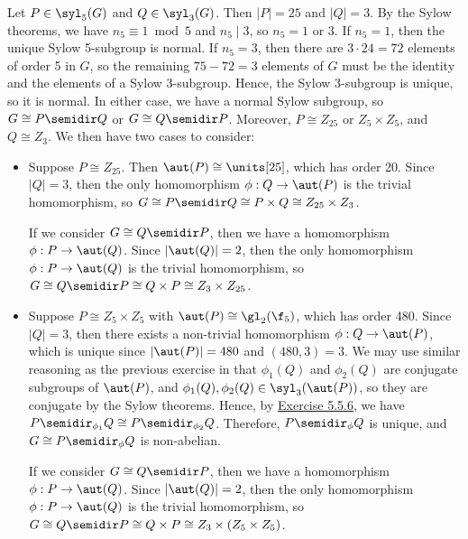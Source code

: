 \begin{sol}
    Let $P \in \syl_5(G)$ and $Q \in \syl_3(G)$. Then $|P| = 25$ and $|Q| = 3$. By the Sylow theorems, we have $n_5 \equiv 1 \bmod 5$ and $n_5 \mid 3$, so $n_5 = 1$ or 3. If $n_5 = 1$, then the unique Sylow 5-subgroup is normal. If $n_5 = 3$, then there are $3 \cdot 24 = 72$ elements of order 5 in $G$, so the remaining $75 - 72 = 3$ elements of $G$ must be the identity and the elements of a Sylow 3-subgroup. Hence, the Sylow 3-subgroup is unique, so it is normal. In either case, we have a normal Sylow subgroup, so $G \cong P \semidir Q$ or $G \cong Q \semidir P$. Moreover, $P \cong Z_{25}$ or $Z_5 \times Z_5$, and $Q \cong Z_3$. We then have two cases to consider:
    \begin{itemize}
        \item Suppose $P \cong Z_{25}$. Then $\aut(P) \cong \units[25]$, which has order 20. Since $|Q| = 3$, then the only homomorphism $\phi : Q \to \aut(P)$ is the trivial homomorphism, so $G \cong P \semidir Q \cong P \times Q \cong Z_{25} \times Z_3$.
        
        If we consider $G \cong Q \semidir P$, then we have a homomorphism $\phi : P \to \aut(Q)$. Since $|\aut(Q)| = 2$, then the only homomorphism $\phi : P \to \aut(Q)$ is the trivial homomorphism, so $G \cong Q \semidir P \cong Q \times P \cong Z_3 \times Z_{25}$.
        \item Suppose $P \cong Z_5 \times Z_5$ with $\aut(P) \cong \gl_2(\f_5)$, which has order 480. Since $|Q| = 3$, then there exists a non-trivial homomorphism $\phi : Q \to \aut(P)$, which is unique since $|\aut(P)| = 480$ and $(480, 3) = 3$. We may use similar reasoning as the previous exercise in that $\phi_1(Q)$ and $\phi_2(Q)$ are conjugate subgroups of $\aut(P)$, and $\phi_1(Q), \phi_2(Q) \in \syl_3(\aut(P))$, so they are conjugate by the Sylow theorems. Hence, by \hyperref[ex5.5.6]{Exercise 5.5.6}, we have $P \semidir_{\phi_1} Q \cong P \semidir_{\phi_2} Q$. Therefore, $P \semidir_\phi Q$ is unique, and $G \cong P \semidir_\phi Q$ is non-abelian.
        
        If we consider $G \cong Q \semidir P$, then we have a homomorphism $\phi : P \to \aut(Q)$. Since $|\aut(Q)| = 2$, then the only homomorphism $\phi : P \to \aut(Q)$ is the trivial homomorphism, so $G \cong Q \semidir P \cong Q \times P \cong Z_3 \times (Z_5 \times Z_5)$.
    \end{itemize}
\end{sol}

